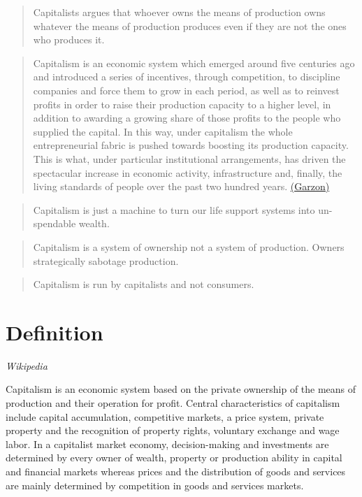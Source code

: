 \documentclass[
]{book}
\begin{document}
\begin{quote}
Capitalists argues that whoever owns the means of
production owns whatever the means of production
produces even if they are not the ones who produces it.
\end{quote}

\begin{quote}
Capitalism is an economic system which emerged around five centuries ago and introduced a series of incentives, through competition, to discipline companies and force them to grow in each period, as well as to reinvest profits in order to raise their production capacity to a higher level, in addition to awarding a growing share of those profits to the people who supplied the capital. In this way, under capitalism the whole entrepreneurial fabric is pushed towards boosting its production capacity. This is what, under particular institutional arrangements, has driven the spectacular increase in economic activity, infrastructure and, finally, the living standards of people over the past two hundred years. \href{https://la-u.org/the-limits-to-growth-eco-socialism-or-barbarism/}{(Garzon)}
\end{quote}

\begin{quote}
Capitalism is just a machine to turn our life support systems into un-spendable wealth.
\end{quote}

\begin{quote}
Capitalism is a system of ownership not a system of production. Owners strategically sabotage production.
\end{quote}

\begin{quote}
Capitalism is run by capitalists and not consumers.
\end{quote}

\hypertarget{definition}{%
\section{Definition}\label{definition}}

\emph{Wikipedia}

Capitalism is an economic system based on the private ownership of the means of production and their operation for profit.
Central characteristics of capitalism include capital accumulation, competitive markets, a price system, private property and the recognition of property rights, voluntary exchange and wage labor.
In a capitalist market economy, decision-making and investments are determined by every owner of wealth, property or production ability in capital and financial markets whereas prices and the distribution of goods and services are mainly determined by competition in goods and services markets.
\end{document}
